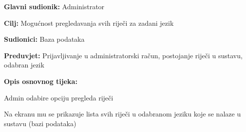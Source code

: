 \noindent {}
\begin{packed_item}

	\item \textbf{Glavni sudionik: } Administrator
	\item \textbf{Cilj: } Mogućnost pregledavanja svih riječi za zadani jezik
	\item \textbf{Sudionici: } Baza podataka
	\item \textbf{Preduvjet: } Prijavljivanje u administratorski račun, postojanje riječi u sustavu, odabran jezik
	\item  \textbf{Opis osnovnog tijeka:}
	
	\item[] \begin{packed_enum}
		
		\item Admin odabire opciju pregleda riječi
		\item Na ekranu mu se prikazuje lista svih riječi u odabranom jeziku koje se nalaze u sustavu (bazi podataka)

	\end{packed_enum}
	
\end{packed_item}

